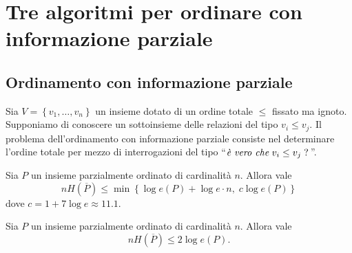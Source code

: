 \chapter{Tre algoritmi per ordinare con informazione parziale}

\section{Ordinamento con informazione parziale} Sia \(V=\left\{v_1,\dots,v_n\right\}\) un insieme dotato di un ordine totale \(\le\) fissato ma ignoto. Supponiamo di conoscere un sottoinsieme delle relazioni del tipo \(v_i\le v_j\). Il problema dell'ordinamento con informazione parziale consiste nel determinare l'ordine totale per mezzo di interrogazioni del tipo ``\(\text{\emph{è vero che}}\;v_i\le v_j\;\text{?}\,\)''. 
\begin{theorem}
	 Sia \(P\) un insieme parzialmente ordinato di cardinalità \(n\). Allora vale
	\[nH\left(\overline{P}\right)\le\min\left\{\log{e(P)}+\log{e\cdot n},\; c\log{e(P)}\right\}\]
	dove \(c=1+7\log{e}\approx 11.1\). 
\end{theorem}
\begin{theorem}
	 Sia \(P\) un insieme parzialmente ordinato di cardinalità \(n\). Allora vale
	\[nH\left(\overline{P}\right)\le 2\log{e(P)}.\]
\end{theorem}
